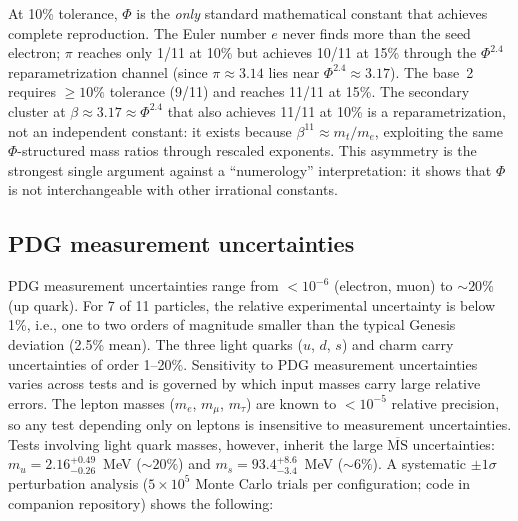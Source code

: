 \documentclass[11pt,a4paper]{article}
\begin{document}
\noindent
At 10\% tolerance, $\Phi$ is the \emph{only} standard mathematical constant
that achieves complete reproduction. The Euler number $e$ never finds
more than the seed electron; $\pi$ reaches only 1/11 at 10\% but
achieves 10/11 at 15\% through the $\Phi^{2.4}$ reparametrization
channel (since $\pi \approx 3.14$ lies near $\Phi^{2.4} \approx 3.17$).
The base~2 requires $\geq 10\%$ tolerance (9/11) and reaches 11/11 at
15\%. The secondary cluster at $\beta \approx 3.17 \approx \Phi^{2.4}$
that also achieves 11/11 at 10\% is a reparametrization, not an
independent constant: it exists because $\beta^{11} \approx m_t/m_e$,
exploiting the same $\Phi$-structured mass ratios through rescaled
exponents. This asymmetry is the strongest single argument against
a ``numerology'' interpretation: it shows that $\Phi$ is not
interchangeable with other irrational constants.

\subsection{PDG measurement uncertainties}
\label{sec:pdg_errors}

PDG measurement uncertainties range from $< 10^{-6}$ (electron,
muon) to $\sim 20\%$ (up quark). For 7 of 11 particles, the relative
experimental uncertainty is below 1\%, i.e., one to two orders of
magnitude smaller than the typical Genesis deviation (2.5\% mean).
The three light quarks ($u$, $d$, $s$) and charm carry uncertainties
of order 1--20\%.
Sensitivity to PDG measurement uncertainties varies across tests and
is governed by which input masses carry large relative errors.
The lepton masses ($m_e$, $m_\mu$, $m_\tau$) are known to
$< 10^{-5}$ relative precision, so any test depending only on leptons
is insensitive to measurement uncertainties.
Tests involving light quark masses, however, inherit the large
$\overline{\text{MS}}$ uncertainties:
$m_u = 2.16^{+0.49}_{-0.26}$~MeV ($\sim 20\%$) and
$m_s = 93.4^{+8.6}_{-3.4}$~MeV ($\sim 6\%$).
A systematic $\pm 1\sigma$ perturbation analysis ($5 \times 10^5$
Monte Carlo trials per configuration; code in companion repository)
shows the following:
\end{document}
